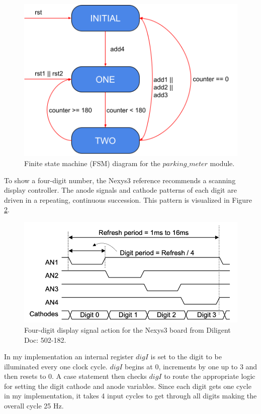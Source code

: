 \documentclass{article}
\begin{document}
\begin{figure}[H]
    \centering
    \includegraphics[scale=0.6]{../figs/FSM.png}
    \caption{Finite state machine (FSM) diagram for the $parking\_meter$ module.}
    \label{fig:fsm}
\end{figure}

To show a four-digit number, the Nexys3 reference recommends a scanning display controller. The anode signals and cathode patterns of each digit are driven in a repeating, continuous succession. This pattern is visualized in Figure \ref{fig:sig-action}.

\begin{figure}[H]
    \centering
    \includegraphics[scale=0.6]{../figs/sig-action.png}
    \caption{Four-digit display signal action for the Nexys3 board from Diligent Doc: 502-182.}
    \label{fig:sig-action}
\end{figure}

In my implementation an internal register $digI$ is set to the digit to be illuminated every one clock cycle. $digI$ begins at $0$, increments by one up to $3$ and then resets to $0$. A case statement then checks $digI$ to route the appropriate logic for setting the digit cathode and anode variables. Since each digit gets one cycle in my implementation, it takes 4 input cycles to get through all digits making the overall cycle 25 Hz.
\end{document}
